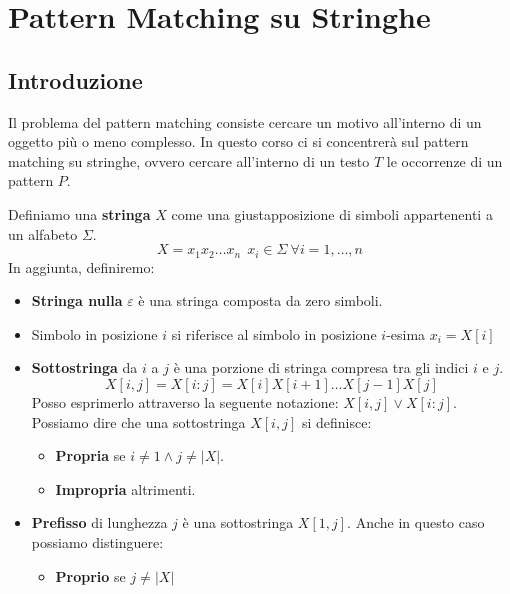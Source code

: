 \chapter{Pattern Matching su Stringhe}
\section{Introduzione}
Il problema del pattern matching consiste cercare un motivo all'interno di un
oggetto più o meno complesso. In questo corso ci si concentrerà sul pattern matching
su stringhe, ovvero cercare all'interno di un testo $T$ le occorrenze di un
pattern $P$.
\begin{definizione}
    Definiamo una \textbf{stringa} $X$ come una giustapposizione di simboli
    appartenenti a un alfabeto $\Sigma$.
    \begin{equation}
        X=x_1x_2\dots x_n \ \ x_i \in \Sigma \ \forall i = 1, \dots, n
    \end{equation}
    In aggiunta, definiremo:
    \begin{itemize}
        \item \textbf{Stringa nulla} $\varepsilon$ è una stringa composta da
              zero simboli.
        \item Simbolo in posizione $i$ si riferisce al simbolo in posizione
              $i$-esima $x_i = X[i]$
        \item \textbf{Sottostringa} da $i$ a $j$ è una porzione di stringa
              compresa tra gli indici $i$ e $j$.
              \begin{equation}
                  X[i, j] = X[i:j] = X[i]X[i+1]\dots X[j - 1]X[j]
              \end{equation}
              Posso esprimerlo attraverso la seguente notazione: $X[i, j] \lor X[i:j]$.
              Possiamo dire che una sottostringa $X[i, j]$ si definisce:
              \begin{itemize}
                  \item \textbf{Propria} se $i \neq 1 \land j \neq |X|$.
                  \item \textbf{Impropria} altrimenti.
              \end{itemize}
        \item \textbf{Prefisso} di lunghezza $j$ è una sottostringa $X[1, j]$.
              Anche in questo caso possiamo distinguere:
              \begin{itemize}
                  \item \textbf{Proprio} se $j \neq |X|$

\end{itemize}
\end{itemize}
\end{definizione}
